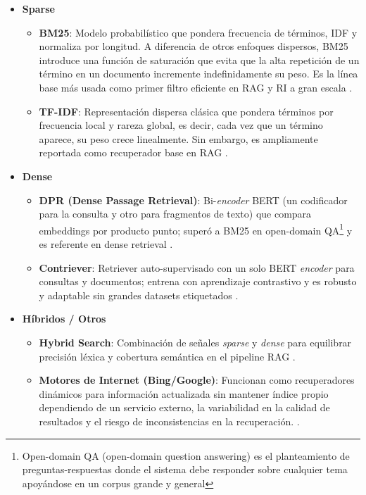 \begin{itemize}
  \item \textbf{Sparse}
    \begin{itemize}
      \item \textbf{BM25}: Modelo probabilístico que pondera frecuencia de términos, IDF y normaliza por longitud. A diferencia de otros enfoques dispersos, BM25 introduce una función de saturación que evita que la alta repetición de un término en un documento incremente indefinidamente su peso. Es la línea base más usada como primer filtro eficiente en RAG y RI a gran escala \textcite{hambarde2023ir,han2024rag}.
      \item \textbf{TF-IDF}: Representación dispersa clásica que pondera términos por frecuencia local y rareza global, es decir, cada vez que un término aparece, su peso crece linealmente. Sin embargo, es ampliamente reportada como recuperador base en RAG \textcite{jiang2024textmatching,zhai2024llmIR}.
    \end{itemize}

  \item \textbf{Dense}
    \begin{itemize}
      \item \textbf{DPR (Dense Passage Retrieval)}: Bi-\textit{encoder} BERT (un codificador para la consulta y otro para fragmentos de texto) que compara embeddings por producto punto; superó a BM25 en open-domain QA\footnote{Open-domain QA (open-domain 
      question answering) es el planteamiento de preguntas-respuestas donde el sistema debe responder sobre cualquier tema apoyándose
      en un corpus grande y general} y es referente en dense retrieval \textcite{fan2021pretraining,han2024rag}.
      \item \textbf{Contriever}: Retriever auto-supervisado con un solo BERT \textit{encoder} para consultas y documentos; entrena con aprendizaje contrastivo y es robusto y adaptable sin grandes datasets etiquetados \textcite{hambarde2023ir}.
    \end{itemize}

  \item \textbf{Híbridos / Otros}
    \begin{itemize}
      \item \textbf{Hybrid Search}: Combinación de señales \textit{sparse} y \textit{dense} para equilibrar precisión léxica y cobertura semántica en el pipeline RAG \textcite{gao2023rag}.
      \item \textbf{Motores de Internet (Bing/Google)}: Funcionan como recuperadores dinámicos para información actualizada sin mantener índice propio dependiendo de un servicio externo, la variabilidad en la calidad de resultados y el riesgo de inconsistencias en la recuperación. \textcite{hambarde2023ir}.
    \end{itemize}
\end{itemize}







